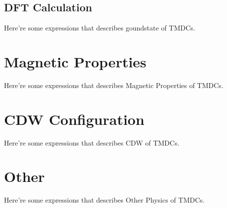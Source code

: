 \subsection{DFT Calculation}
Here're some expressions that describes goundstate of TMDCs.

\section{Magnetic Properties}
Here're some expressions that describes Magnetic Properties of TMDCs.

\section{CDW Configuration}
Here're some expressions that describes CDW of TMDCs.

\section{Other}
Here're some expressions that describes Other Physics of TMDCs.